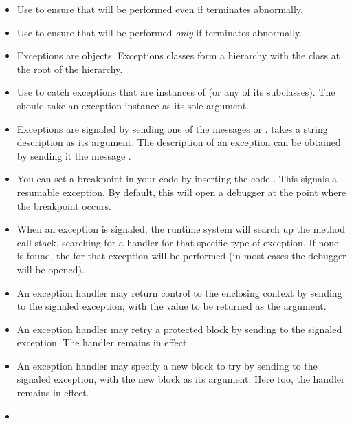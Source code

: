 \documentclass[a4paper,10pt,twoside]{book}
\begin{document}
\begin{itemize}
\item Use  to ensure that  will be performed even if  terminates abnormally.

\item Use  to ensure that  will be performed \emph{only} if  terminates abnormally.

\item Exceptions are objects. Exceptions classes form a hierarchy with the class  at the root of the hierarchy.

\item Use  to catch exceptions that are instances of  (or any of its subclasses). The  should take an exception instance as its sole argument.

\item Exceptions are signaled by sending one of the messages  or .  takes a string description as its argument. The description of an exception can be obtained by sending it the message .

\item You can set a breakpoint in your code by inserting the code . This signals a resumable  exception. By default, this will open a debugger at the point where the breakpoint occurs.

\item When an exception is signaled, the runtime system will search up the method call stack, searching for a handler for that specific type of exception. If none is found, the  for that exception will be performed (\ie in most cases the debugger will be opened).

\item An exception handler may return control to the enclosing context by sending  to the signaled exception, with the value to be returned as the argument.

\item An exception handler may retry a protected block by sending  to the signaled exception. The handler remains in effect.

\item An exception handler may specify a new block to try by sending  to the signaled exception, with the new block as its argument. Here too, the handler remains in effect.

\item {}

\end{itemize}
\end{document}
